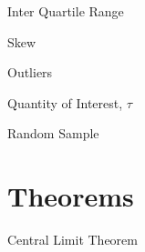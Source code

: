 \documentclass[11pt,a4paper]{article}
\begin{document}
\begin{definition}{Inter Quartile Range}

\end{definition}

\begin{definition}{Skew}

\end{definition}

\begin{definition}{Outliers}

\end{definition}

\begin{definition}{Quantity of Interest, $\tau$}

\end{definition}

\begin{definition}{Random Sample}

\end{definition}

\section{Theorems}

\begin{theorem}{Central Limit Theorem}
\end{theorem}
\end{document}
